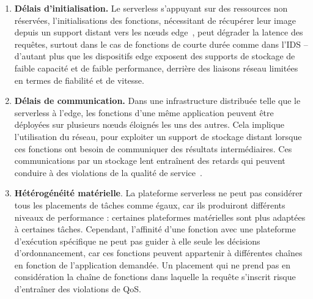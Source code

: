 \begin{enumerate}
    \item \textbf{Délais d'initialisation.} Le serverless s'appuyant sur des ressources non réservées, l'initialisations des fonctions, nécessitant de récupérer leur image depuis un support distant vers les nœuds edge~\cite{yanHermesEfficientCache2020}, peut dégrader la latence des requêtes, surtout dans le cas de fonctions de courte durée comme dans l'IDS -- d'autant plus que les dispositifs edge exposent des supports de stockage de faible capacité et de faible performance, derrière des liaisons réseau limitées en termes de fiabilité et de vitesse.
    \item \textbf{Délais de communication.} Dans une infrastructure distribuée telle que le serverless à l'edge, les fonctions d'une même application peuvent être déployées sur plusieurs nœuds éloignés les uns des autres. Cela implique l'utilisation du réseau, pour exploiter un support de stockage distant lorsque ces fonctions ont besoin de communiquer des résultats intermédiaires. Ces communications par un stockage lent entraînent des retards qui peuvent conduire à des violations de la qualité de service~\cite{wawrzoniakBoxerDataAnalytics2021a}.
    \item \textbf{Hétérogénéité matérielle}. La plateforme serverless ne peut pas considérer tous les placements de tâches comme égaux, car ils produiront différents niveaux de performance : certaines plateformes matérielles sont plus adaptées à certaines tâches. Cependant, l'affinité d'une fonction avec une plateforme d'exécution spécifique ne peut pas guider à elle seule les décisions d'ordonnancement, car ces fonctions peuvent appartenir à différentes chaînes en fonction de l'application demandée. Un placement qui ne prend pas en considération la chaîne de fonctions dans laquelle la requête s'inscrit risque d'entraîner des violations de QoS.
\end{enumerate}

